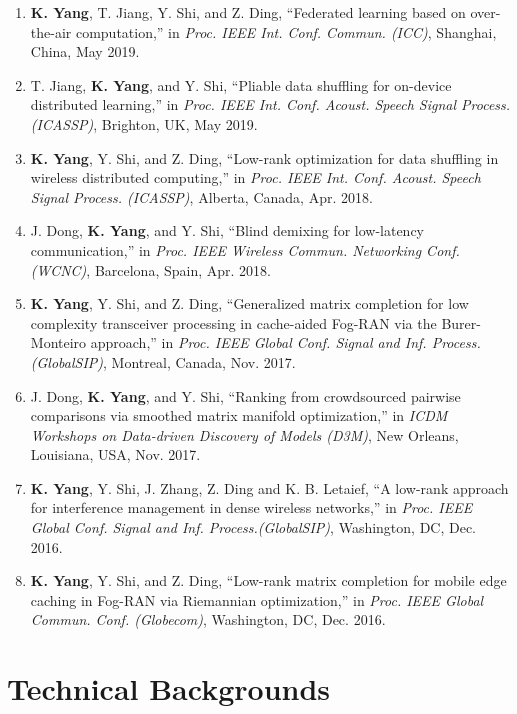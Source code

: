 \documentclass{article}
\begin{document}
\begin{enumerate}
\item \textbf{K. Yang}, T. Jiang, Y. Shi, and Z. Ding, ``Federated learning based on over-the-air computation,'' in \textit{Proc. IEEE Int. Conf. Commun. (ICC)}, Shanghai, China, May 2019.
\item T. Jiang, \textbf{K. Yang}, and Y. Shi, ``Pliable data shuffling for on-device distributed learning,'' in \textit{Proc. IEEE Int. Conf. Acoust. Speech Signal Process. (ICASSP)}, Brighton, UK, May 2019.

\item \textbf{K. Yang}, Y. Shi, and Z. Ding, ``Low-rank optimization for data shuffling in wireless distributed computing,'' in \textit{Proc. IEEE Int. Conf. Acoust. Speech Signal Process. (ICASSP)}, Alberta, Canada,
        Apr. 2018.
        \item J. Dong, \textbf{K. Yang}, and Y. Shi, ``Blind demixing for low-latency communication,'' in \textit{Proc. IEEE Wireless Commun. Networking Conf. (WCNC)}, Barcelona, Spain, Apr. 2018.
        \item \textbf{K. Yang}, Y. Shi, and Z. Ding, ``Generalized matrix completion for low complexity transceiver processing in cache-aided Fog-RAN via the Burer-Monteiro approach,'' in \textit{Proc. IEEE Global Conf. Signal and Inf. Process. (GlobalSIP)}, Montreal, Canada, Nov. 2017.
        \item J. Dong, \textbf{K. Yang}, and Y. Shi, ``Ranking from crowdsourced pairwise comparisons via smoothed matrix manifold optimization,'' in \textit{ICDM Workshops on Data-driven Discovery of Models (D3M)}, New Orleans, Louisiana, USA, Nov. 2017.
        \item \textbf{K. Yang}, Y. Shi, J. Zhang, Z. Ding and K. B. Letaief, ``A low-rank approach for interference management in dense wireless networks,'' in \textit{Proc. IEEE Global Conf. Signal and Inf. Process.(GlobalSIP)}, Washington, DC, Dec. 2016.
        \item \textbf{K. Yang}, Y. Shi, and Z. Ding, ``Low-rank matrix completion for mobile edge caching in Fog-RAN via Riemannian optimization,'' in \textit{Proc. IEEE Global Commun. Conf. (Globecom)}, Washington, DC, Dec. 2016.
        
        
\end{enumerate}


\section*{\colorbox{mygrey}{Technical Backgrounds ~~~~~~~~~~~~~~~~~~~~~~~~~~~~~~~~~~~~~~~~~~~~~~~~~~~~~~~~~~~~~~~~~~~~~~~~}}
\end{document}
